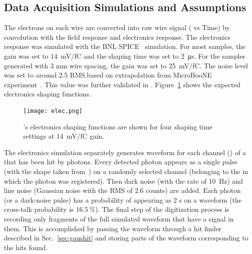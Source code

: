 \subsection{Data Acquisition Simulations and Assumptions}
\label{sec:tools-mc-daq}


  The electrons on each wire are converted into raw wire signal ( vs Time) by convolution with the field response and electronics response. The  electronics response was simulated with the BNL SPICE~\cite{spice} simulation.  For most samples, the  gain was set to \SI{14}{mV/fC} and the shaping time was set to \SI{2}{\micro\second}. For the samples generated with 3 mm wire spacing, the  gain was set to \SI{25}{mV/fC}. The noise level was set to around 2.5  RMS,based on extrapolation 
  from MicroBooNE experiment~\cite{Acciarri:2017sde}. This value was further validated in . %
  Figure~\ref{elec_resp} shows the expected electronics shaping functions.

\begin{figure}[!h!tbp]
\centering
\texttt{[image: elec.png]}
\caption['s electronics shaping functions]{'s electronics shaping functions
are shown for four shaping time settings at \SI{14}{mV/fC} gain.}
\label{elec_resp}
\end{figure}


The  electronics simulation separately generates waveform 
for each channel () of a  that has been hit by photons.
Every detected photon %
appears as a single \phel{} pulse
(with the shape taken from~\cite{http://lss.fnal.gov/archive/2015/pub/fermilab-pub-15-488-nd-ppd.pdf:2015gov}) on a randomly selected channel
(belonging to the  in which the photon was registered).
Then dark noise (with the rate of \SI{10}{Hz}) and 
line noise (Gaussian noise with the RMS of $2.6$  counts) are added.
Each photon (or a dark-noise pulse) has a probability of appearing
as $2$ \phel{}s on a waveform (the cross-talk probability is $16.5~\%$).
The final step of the digitization process is recording only fragments
of the full simulated waveform that have a signal in them.
This is accomplished by passing the waveform through a hit finder
described in Sec.~\ref{sec:gaushit} 
and storing parts of the waveform corresponding to the hits found.


